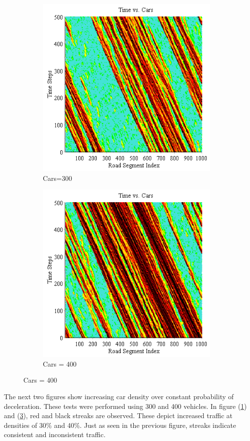 \documentclass[12pt]{extarticle}
\begin{document}
\begin{figure}[h!]
	\caption{Roads = 1000, Prob = 0.05}
	\begin{subfigure}{0.50\textwidth}
		\includegraphics[scale=0.50]{Graph2.png}
		\caption{Cars=300}
		\label{fig:img2}
	\end{subfigure}
	\begin{subfigure}{0.50\textwidth}
		\includegraphics[scale=0.50]{Graph3.png}
		\caption{Cars = 400}
		\label{fig:img3}
	\end{subfigure}
\end{figure}

The next two figures show increasing car density over constant probability of deceleration. These tests were performed using 300 and 400 vehicles. In figure (\ref{fig:img2}) and (\ref{fig:img3}), red and black streaks are observed. These depict increased traffic at densities of 30\% and 40\%. Just as seen in the previous figure, streaks indicate consistent and inconsistent traffic. 
\end{document}
